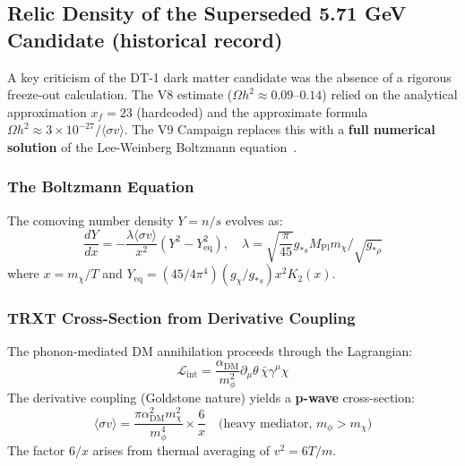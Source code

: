 \documentclass[a4paper,12pt]{article}
\begin{document}
\subsection{Relic Density of the Superseded 5.71 GeV Candidate (historical record)}

A key criticism of the DT-1 dark matter candidate was the absence of a rigorous freeze-out calculation. The V8 estimate ($\Omega h^2 \approx 0.09$--$0.14$) relied on the analytical approximation $x_f = 23$ (hardcoded) and the approximate formula $\Omega h^2 \approx 3 \times 10^{-27} / \langle\sigma v\rangle$. The V9 Campaign replaces this with a \textbf{full numerical solution} of the Lee-Weinberg Boltzmann equation~\cite{leeweinberg1977}.

\subsubsection{The Boltzmann Equation}
The comoving number density $Y = n/s$ evolves as:
\begin{equation}
    \frac{dY}{dx} = -\frac{\lambda \langle\sigma v\rangle}{x^2} \left(Y^2 - Y_{\mathrm{eq}}^2\right), \quad \lambda = \sqrt{\frac{\pi}{45}} g_{*s} M_{\mathrm{Pl}} m_\chi / \sqrt{g_{*\rho}}
    \label{eq:boltzmann_freeze}
\end{equation}
where $x = m_\chi/T$ and $Y_{\mathrm{eq}} = (45/4\pi^4)(g_\chi/g_{*s}) x^2 K_2(x)$.

\subsubsection{TRXT Cross-Section from Derivative Coupling}
The phonon-mediated DM annihilation proceeds through the Lagrangian:
\begin{equation}
    \mathcal{L}_{\mathrm{int}} = \frac{\alpha_{\mathrm{DM}}}{m_\phi^2} \partial_\mu \theta \, \bar{\chi} \gamma^\mu \chi
\end{equation}
The derivative coupling (Goldstone nature) yields a \textbf{p-wave} cross-section:
\begin{equation}
    \langle\sigma v\rangle = \frac{\pi \alpha_{\mathrm{DM}}^2 m_\chi^2}{m_\phi^4} \times \frac{6}{x} \quad \text{(heavy mediator, } m_\phi > m_\chi\text{)}
\end{equation}
The factor $6/x$ arises from thermal averaging of $v^2 = 6T/m$.
\end{document}
